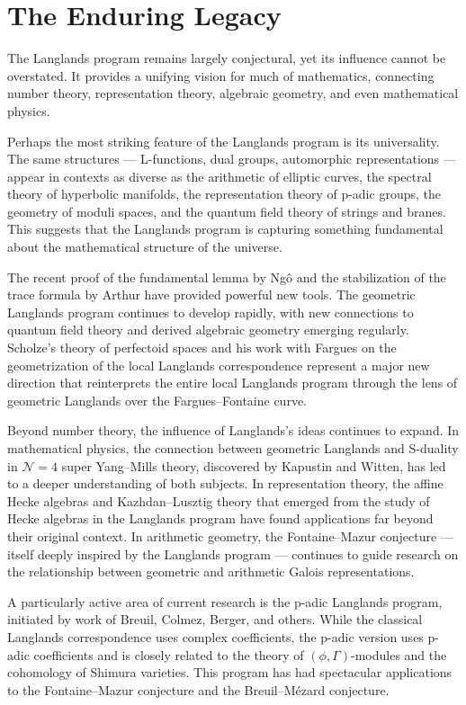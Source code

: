 \section{The Enduring Legacy}

The Langlands program remains largely conjectural, yet its influence cannot be overstated. It provides a unifying vision for much of mathematics, connecting number theory, representation theory, algebraic geometry, and even mathematical physics.

Perhaps the most striking feature of the Langlands program is its universality. The same structures --- L-functions, dual groups, automorphic representations --- appear in contexts as diverse as the arithmetic of elliptic curves, the spectral theory of hyperbolic manifolds, the representation theory of p-adic groups, the geometry of moduli spaces, and the quantum field theory of strings and branes. This suggests that the Langlands program is capturing something fundamental about the mathematical structure of the universe.

The recent proof of the fundamental lemma by Ng\^{o} and the stabilization of the trace formula by Arthur have provided powerful new tools. The geometric Langlands program continues to develop rapidly, with new connections to quantum field theory and derived algebraic geometry emerging regularly. Scholze's theory of perfectoid spaces and his work with Fargues on the geometrization of the local Langlands correspondence represent a major new direction that reinterprets the entire local Langlands program through the lens of geometric Langlands over the Fargues--Fontaine curve.

Beyond number theory, the influence of Langlands's ideas continues to expand. In mathematical physics, the connection between geometric Langlands and S-duality in \(\mathcal{N}=4\) super Yang--Mills theory, discovered by Kapustin and Witten, has led to a deeper understanding of both subjects. In representation theory, the affine Hecke algebras and Kazhdan--Lusztig theory that emerged from the study of Hecke algebras in the Langlands program have found applications far beyond their original context. In arithmetic geometry, the Fontaine--Mazur conjecture --- itself deeply inspired by the Langlands program --- continues to guide research on the relationship between geometric and arithmetic Galois representations.

A particularly active area of current research is the p-adic Langlands program, initiated by work of Breuil, Colmez, Berger, and others. While the classical Langlands correspondence uses complex coefficients, the p-adic version uses p-adic coefficients and is closely related to the theory of \((\phi,\Gamma)\)-modules and the cohomology of Shimura varieties. This program has had spectacular applications to the Fontaine--Mazur conjecture and the Breuil--M\'{e}zard conjecture.

